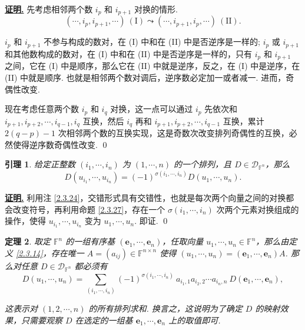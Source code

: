 \documentclass[10pt,openany]{article}
\theoremstyle{thmstyle} %
\newtheorem{theorem}{定理}[subsection]
\theoremstyle{defstyle} %
\newtheorem{lemma}[theorem]{引理}
\theoremstyle{prostyle} %
\theoremstyle{exastyle}
\theoremstyle{remstyle}
\renewenvironment{proof}[1][证明]{\par\underline{\textbf{#1.}} \;\fangsong}{\qed\par}
\newcommand{\F}{\mathbb{F}}
\newcommand{\n}{^{n \times n}}
\newcommand{\bme}{\bm{e}}
\begin{document}
\begin{proof}
	先考虑相邻两个数 \( i_p \) 和 \( i_{p+1} \) 对换的情形. 
	\[ (\cdots,i_p,i_{p+1},\cdots) \ (\text{I}) \leadsto (\cdots,i_{p+1},i_{p},\cdots) \ (\text{II}). \]
	
	 \( i_p \) 和 \( i_{p+1} \) 不参与构成的数对，在 (I) 中和在 (II) 中是否逆序是一样的; \( i_p \) 或 \( i_{p+1} \) 和其他数构成的数对，在 (I) 中和在 (II) 中是否逆序是一样的，只有 \( i_p \) 和 \( i_{p+1} \) 之间，它在 (I) 中是顺序，那么它在 (II) 中就是逆序，反之，在 (I) 中是逆序，在 (II) 中就是顺序. 也就是相邻两个数对调后，逆序数必定加一或者减一. 进而，奇偶性改变. 
	 
	 现在考虑任意两个数 \( i_p \) 和 \( i_q \) 对换，这一点可以通过 \( i_p \) 先依次和 \( i_{p+1}, i_{p+2},\cdots,i_{q-1}, i_q \) 互换，然后 \( i_q \) 再和 \( i_{p+1}, i_{p+2},\cdots,i_{q-1} \) 互换，累计 \( 2(q-p)-1 \) 次相邻两个数的互换实现，这是奇数次改变排列奇偶性的互换，必然使得逆序数奇偶性改变.
\end{proof}

\begin{lemma} \label{2.3.29}
	给定正整数 \( (i_1,\cdots,i_n) \) 为 \( (1,\cdots,n) \) 的一个排列，且 \( D \in \mathcal{D}_{\F^n} \)，那么
	\[ D(u_{i_1},\cdots,u_{i_n})=(-1)^{\sigma(i_1,\cdots,i_n)} D(u_1,\cdots,u_n). \]
\end{lemma}

\begin{proof}
	利用注 \ref{2.3.24}，交错形式具有交错性，也就是每次两个向量之间的对换都会改变符号，再利用命题 \ref{2.3.27}，存在一个 \( \sigma(i_1,\cdots,i_n) \) 次两个元素对换组成的操作，使得 \( u_{i_1},\cdots,u_{i_n} \) 变为 \( u_1,\cdots,u_n \). 即证.
\end{proof}

\begin{theorem} \label{2.3.30}
	取定 \( \F^n \) 的一组有序基 \( (\bme_1,\cdots,\bme_n) \)，任取向量 \( u_1,\cdots,u_n \in \F^n \)，那么由定义 \ref{2.3.14}，存在唯一 \( A=(a_{ij}) \in \F\n \) 使得 \( (u_1,\cdots,u_n)=(\bme_1,\cdots,\bme_n)A \). 那么对任意 \( D \in \mathcal{D}_{\F^n} \) 都必须有
	\begin{equation}
		 D(u_1,\cdots,u_n)= \sum_{(i_1,\cdots,i_n)}^{} (-1)^{\sigma(i_1,\cdots,i_n)} \ a_{i_1,1}a_{i_2,2}\cdots a_{i_n,n} \ D(\bme_1,\cdots,\bme_n),
		 \label{equ2.3.1}
	\end{equation}
	
	这表示对 \( (1,2,\cdots,n) \) 的所有排列求和. 换言之，这说明为了确定 \( D \) 的映射效果，只需要观察 \( D \) 在选定的一组基 \( \bme_1,\cdots,\bme_n \) 上的取值即可.
\end{theorem}
\end{document}
